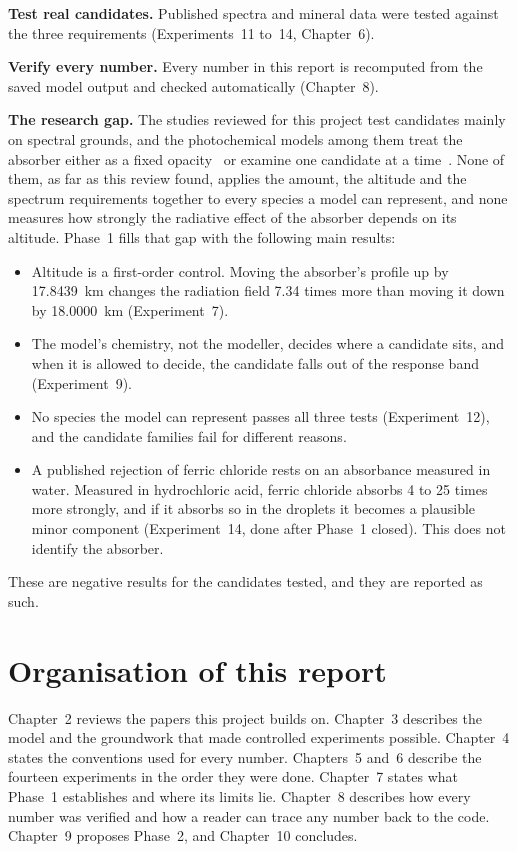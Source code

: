 \textbf{Test real candidates.} Published spectra and mineral data were tested against the
three requirements (Experiments~11 to~14, Chapter~6).

\textbf{Verify every number.} Every number in this report is recomputed from
the saved model output and checked automatically (Chapter~8).

\textbf{The research gap.} The studies reviewed for this project test candidates mainly on
spectral grounds, and the photochemical models among them treat the absorber either as a
fixed opacity~\cite{dai2024} or examine one candidate at a time~\cite{dai2025review,
egan2025osso}. None of them, as far as this review found, applies the amount, the altitude
and the spectrum requirements together to every species a model can represent, and none
measures how strongly the radiative effect of the absorber depends on its altitude. Phase~1
fills that gap with the following main results:
\begin{itemize}
  \item Altitude is a first-order control. Moving the absorber's profile up by
    17.8439~km changes the radiation field 7.34 times more than moving it down by
    18.0000~km (Experiment~7).
  \item The model's chemistry, not the modeller, decides where a candidate sits, and
    when it is allowed to decide, the candidate falls out of the response band
    (Experiment~9).
  \item No species the model can represent passes all three tests (Experiment~12), and
    the candidate families fail for different reasons.
  \item A published rejection of ferric chloride rests on an absorbance measured in water.
    Measured in hydrochloric acid, ferric chloride absorbs 4 to 25 times more strongly,
    and if it absorbs so in the droplets it becomes a plausible minor component
    (Experiment~14, done after Phase~1 closed). This does not identify the
    absorber.
\end{itemize}
These are negative results for the candidates tested, and they are reported as such.

\section{Organisation of this report}
\label{sec:organisation}

Chapter~2 reviews the papers this project builds on. Chapter~3 describes the model and
the groundwork that made controlled experiments possible. Chapter~4 states the
conventions used for every number. Chapters~5 and~6 describe the fourteen experiments in
the order they were done. Chapter~7 states what Phase~1 establishes and where its limits
lie. Chapter~8 describes how every number was verified and how a reader can trace any
number back to the code. Chapter~9 proposes Phase~2, and Chapter~10 concludes.

